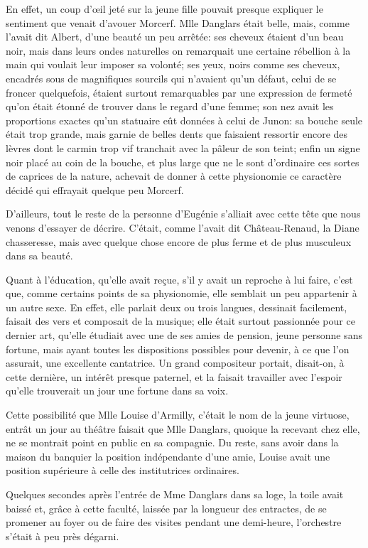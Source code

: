 En effet, un coup d'œil jeté sur la jeune fille pouvait presque expliquer le sentiment que venait d'avouer Morcerf. Mlle Danglars était belle, mais, comme l'avait dit Albert, d'une beauté un peu arrêtée: ses cheveux étaient d'un beau noir, mais dans leurs ondes naturelles on remarquait une certaine rébellion à la main qui voulait leur imposer sa volonté; ses yeux, noirs comme ses cheveux, encadrés sous de magnifiques sourcils qui n'avaient qu'un défaut, celui de se froncer quelquefois, étaient surtout remarquables par une expression de fermeté qu'on était étonné de trouver dans le regard d'une femme; son nez avait les proportions exactes qu'un statuaire eût données à celui de Junon: sa bouche seule était trop grande, mais garnie de belles dents que faisaient ressortir encore des lèvres dont le carmin trop vif tranchait avec la pâleur de son teint; enfin un signe noir placé au coin de la bouche, et plus large que ne le sont d'ordinaire ces sortes de caprices de la nature, achevait de donner à cette physionomie ce caractère décidé qui effrayait quelque peu Morcerf. 

D'ailleurs, tout le reste de la personne d'Eugénie s'alliait avec cette tête que nous venons d'essayer de décrire. C'était, comme l'avait dit Château-Renaud, la Diane chasseresse, mais avec quelque chose encore de plus ferme et de plus musculeux dans sa beauté. 

Quant à l'éducation, qu'elle avait reçue, s'il y avait un reproche à lui faire, c'est que, comme certains points de sa physionomie, elle semblait un peu appartenir à un autre sexe. En effet, elle parlait deux ou trois langues, dessinait facilement, faisait des vers et composait de la musique; elle était surtout passionnée pour ce dernier art, qu'elle étudiait avec une de ses amies de pension, jeune personne sans fortune, mais ayant toutes les dispositions possibles pour devenir, à ce que l'on assurait, une excellente cantatrice. Un grand compositeur portait, disait-on, à cette dernière, un intérêt presque paternel, et la faisait travailler avec l'espoir qu'elle trouverait un jour une fortune dans sa voix. 

Cette possibilité que Mlle Louise d'Armilly, c'était le nom de la jeune virtuose, entrât un jour au théâtre faisait que Mlle Danglars, quoique la recevant chez elle, ne se montrait point en public en sa compagnie. Du reste, sans avoir dans la maison du banquier la position indépendante d'une amie, Louise avait une position supérieure à celle des institutrices ordinaires. 

Quelques secondes après l'entrée de Mme Danglars dans sa loge, la toile avait baissé et, grâce à cette faculté, laissée par la longueur des entractes, de se promener au foyer ou de faire des visites pendant une demi-heure, l'orchestre s'était à peu près dégarni. 

